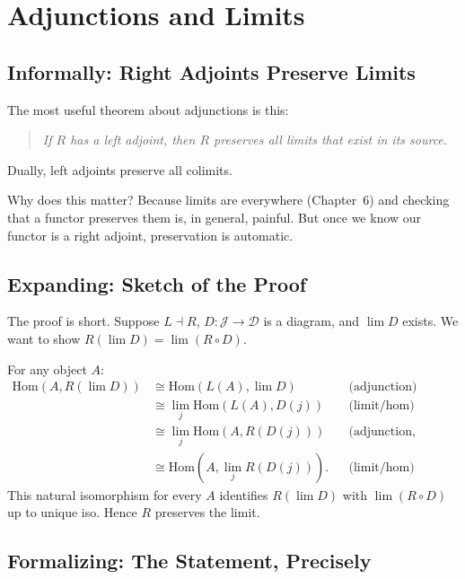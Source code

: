 \section{Adjunctions and Limits}
\label{sec:adjunctions-and-limits}

\subsection{Informally: Right Adjoints Preserve Limits}

The most useful theorem about adjunctions is this:
\begin{quote}
\textit{If $R$ has a left adjoint, then $R$ preserves all limits that
exist in its source.}
\end{quote}
Dually, left adjoints preserve all colimits.

Why does this matter? Because limits are everywhere (Chapter~6) and
checking that a functor preserves them is, in general, painful. But once
we know our functor is a right adjoint, preservation is automatic.

\subsection{Expanding: Sketch of the Proof}

The proof is short. Suppose $L \dashv R$, $D : \mathcal{J} \to \mathcal{D}$
is a diagram, and $\lim D$ exists. We want to show $R(\lim D) = \lim (R
\circ D)$.

For any object $A$:
\begin{align*}
  \mathrm{Hom}(A, R(\lim D))
    &\cong \mathrm{Hom}(L(A), \lim D) && \text{(adjunction)} \\
    &\cong \lim_j \mathrm{Hom}(L(A), D(j)) && \text{(limit/hom)} \\
    &\cong \lim_j \mathrm{Hom}(A, R(D(j))) && \text{(adjunction, pointwise)} \\
    &\cong \mathrm{Hom}(A, \lim_j R(D(j))). && \text{(limit/hom)}
\end{align*}
This natural isomorphism for every $A$ identifies $R(\lim D)$ with $\lim
(R \circ D)$ up to unique iso. Hence $R$ preserves the limit.

\subsection{Formalizing: The Statement, Precisely}

